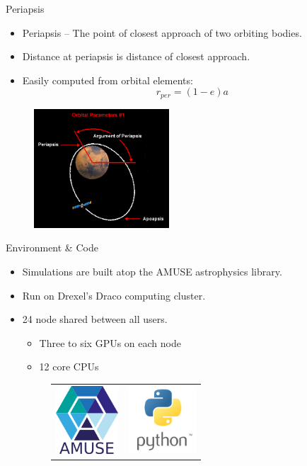 \documentclass{beamer}
\begin{document}
\begin{frame}{Periapsis}
    \begin{itemize}
        \item Periapsis -- The point of closest approach of two orbiting bodies.
        \item Distance at periapsis is distance of closest approach.
        \item Easily computed from orbital elements:
            \begin{equation}
                r_{per} = (1 - e) a
            \end{equation}
    \end{itemize}
    \begin{figure}
        \centering
        \includegraphics[height=1.75in]{periapsis_diag}
    \end{figure}
\end{frame}

\begin{frame}{Environment \& Code}
    \begin{itemize}
        \item Simulations are built atop the AMUSE astrophysics library.
        \item Run on Drexel's Draco computing cluster.
        \item 24 node shared between all users.
        \begin{itemize}
            \item Three to six GPUs on each node
            \item 12 core CPUs
        \end{itemize}
        \begin{figure}
            \centering
            \begin{tabular}{cc}
                \includegraphics[height=1in]{AmuseLogo} & \includegraphics[height=1in]{PythonLogo}
            \end{tabular}
        \end{figure}
    \end{itemize}
\end{frame}
\end{document}
